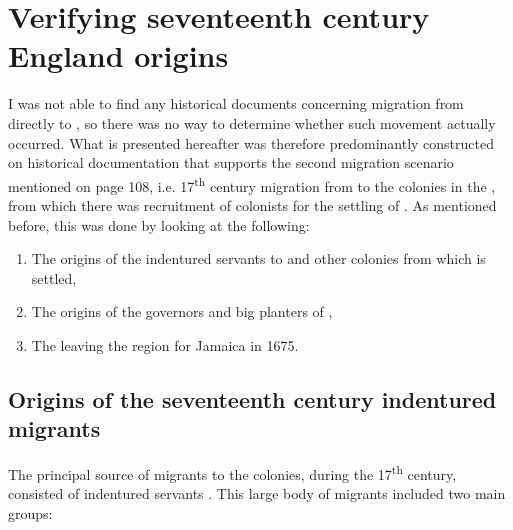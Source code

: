 \section{Verifying seventeenth century England origins}\label{6.2}
I was not able to find any historical documents concerning migration from  directly to , so there was no way to determine whether such movement actually occurred. What is presented hereafter was therefore predominantly constructed on historical documentation that supports the second migration scenario mentioned on page 108, i.e. 17\textsuperscript{th} century migration from  to the  colonies in the , from which there was recruitment of colonists for the settling of . As mentioned before, this was done by looking at the following:

\renewcommand{\labelenumii}{\theenumii}
\begin{enumerate}
\item {The origins of the  indentured servants to  and other  colonies from which  is settled,}
\item{The origins of the  governors and big planters of ,}
\item{The   leaving the  region for Jamaica in 1675.}
\end{enumerate}

\subsection{Origins of the seventeenth century indentured migrants}\label{6.2.1}
The principal source of  migrants to the  colonies, during the 17\textsuperscript{th} century, consisted of indentured servants \citep{Esposito82}. This large body of migrants included two main groups:

\renewcommand{\labelenumii}{\theenumii}

